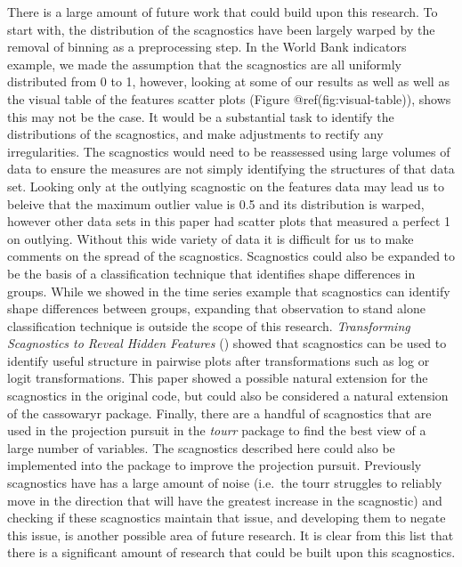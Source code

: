 There is a large amount of future work that could build upon this
research. To start with, the distribution of the scagnostics have been
largely warped by the removal of binning as a preprocessing step. In the
World Bank indicators example, we made the assumption that the
scagnostics are all uniformly distributed from 0 to 1, however, looking
at some of our results as well as well as the visual table of the
features scatter plots (Figure @ref(fig:visual-table)), shows this may
not be the case. It would be a substantial task to identify the
distributions of the scagnostics, and make adjustments to rectify any
irregularities. The scagnostics would need to be reassessed using large
volumes of data to ensure the measures are not simply identifying the
structures of that data set. Looking only at the outlying scagnostic on
the features data may lead us to beleive that the maximum outlier value
is 0.5 and its distribution is warped, however other data sets in this
paper had scatter plots that measured a perfect 1 on outlying. Without
this wide variety of data it is difficult for us to make comments on the
spread of the scagnostics. Scagnostics could also be expanded to be the
basis of a classification technique that identifies shape differences in
groups. While we showed in the time series example that scagnostics can
identify shape differences between groups, expanding that observation to
stand alone classification technique is outside the scope of this
research. \emph{Transforming Scagnostics to Reveal Hidden Features}
(\citet{hidscags}) showed that scagnostics can be used to identify
useful structure in pairwise plots after transformations such as log or
logit transformations. This paper showed a possible natural extension
for the scagnostics in the original code, but could also be considered a
natural extension of the cassowaryr package. Finally, there are a
handful of scagnostics that are used in the projection pursuit in the
\emph{tourr} package to find the best view of a large number of
variables. The scagnostics described here could also be implemented into
the package to improve the projection pursuit. Previously scagnostics
have has a large amount of noise (i.e.~the tourr struggles to reliably
move in the direction that will have the greatest increase in the
scagnostic) and checking if these scagnostics maintain that issue, and
developing them to negate this issue, is another possible area of future
research. It is clear from this list that there is a significant amount
of research that could be built upon this scagnostics.

